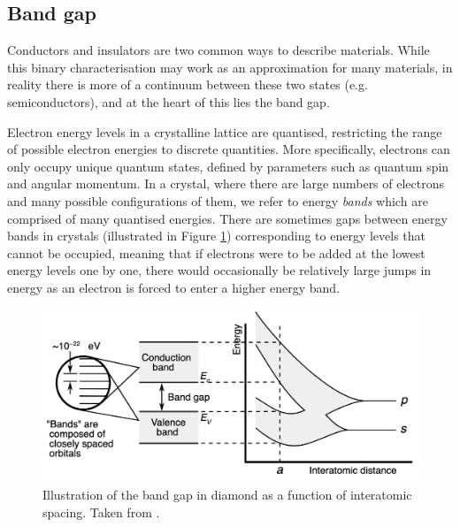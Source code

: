 \subsection{Band gap}

Conductors and insulators are two common ways to describe materials. While this binary characterisation may work as an approximation for many materials, in reality there is more of a continuum between these two states (e.g. semiconductors), and at the heart of this lies the band gap.

Electron energy levels in a crystalline lattice are quantised, restricting the range of possible electron energies to discrete quantities. More specifically, electrons can only occupy unique quantum states, defined by parameters such as quantum spin and angular momentum. In a crystal, where there are large numbers of electrons and many possible configurations of them, we refer to energy \emph{bands} which are comprised of many quantised energies. There are sometimes gaps between energy bands in crystals (illustrated in Figure \ref{figure:band_gap}) corresponding to energy levels that cannot be occupied, meaning that if electrons were to be added at the lowest energy levels one by one, there would occasionally be relatively large jumps in energy as an electron is forced to enter a higher energy band. 

\begin{figure}[ht]
\centering
\includegraphics[width=\linewidth]{images/band_gap.png}
\caption[Illustration of the band gap in diamond as a function of interatomic spacing.]{Illustration of the band gap in diamond as a function of interatomic spacing. Taken from \cite{Chetvorno2017}.}
\label{figure:band_gap}
\end{figure}

